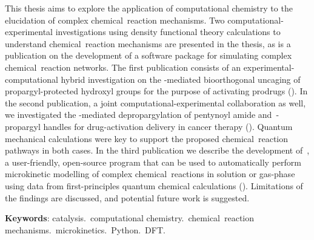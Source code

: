 \setlength{\absparsep}{18pt} %

\begin{resumo}[Abstract]
	This thesis aims to explore the application of computational chemistry to the elucidation of complex chemical~reaction mechanisms.
	Two computational-experimental investigations using density functional theory calculations to understand chemical~reaction mechanisms are presented in the thesis,
	as is a publication on the development of a software package for simulating complex chemical~reaction networks.
	The first publication consists of an experimental-computational hybrid investigation on the -mediated bioorthogonal uncaging of propargyl-protected hydroxyl groups for the purpose of activating prodrugs
	().
	In the second publication,
	a joint computational-experimental collaboration as well,
	we investigated the -mediated depropargylation of pentynoyl amide and~-propargyl handles for drug-activation delivery in cancer therapy
	().
	Quantum mechanical calculations were key to support the proposed chemical~reaction pathways in both cases.
	In the third publication
	we describe the development of~\overreact{},
	a user-friendly,
	open-source program that can be used
	to automatically perform microkinetic modelling of complex chemical~reactions in solution or gas-phase
	using data from first-principles quantum chemical calculations
	().
	Limitations of the findings are discussed,
	and potential future work is suggested.

	\vspace{\onelineskip}

	\noindent
	\textbf{Keywords}:
	catalysis.\ computational chemistry.\ chemical~reaction mechanisms.\ microkinetics.\ Python.\ DFT.\@
\end{resumo}

